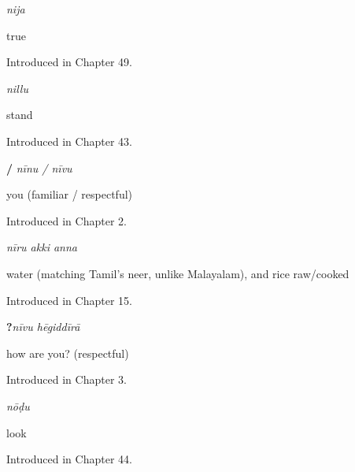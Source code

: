 \noindent\begin{minipage}[t]{\linewidth}
\raggedright
\textbf{}\enspace\emph{nija}\par
\small true\par
\footnotesize Introduced in Chapter 49.
\end{minipage}\par\medskip

\noindent\begin{minipage}[t]{\linewidth}
\raggedright
\textbf{}\enspace\emph{nillu}\par
\small stand\par
\footnotesize Introduced in Chapter 43.
\end{minipage}\par\medskip

\noindent\begin{minipage}[t]{\linewidth}
\raggedright
\textbf{ / }\enspace\emph{nīnu / nīvu}\par
\small you (familiar / respectful)\par
\footnotesize Introduced in Chapter 2.
\end{minipage}\par\medskip

\noindent\begin{minipage}[t]{\linewidth}
\raggedright
\textbf{  }\enspace\emph{nīru akki anna}\par
\small water (matching Tamil's neer, unlike Malayalam), and rice raw/cooked\par
\footnotesize Introduced in Chapter 15.
\end{minipage}\par\medskip

\noindent\begin{minipage}[t]{\linewidth}
\raggedright
\textbf{ ?}\enspace\emph{nīvu hēgiddīrā}\par
\small how are you? (respectful)\par
\footnotesize Introduced in Chapter 3.
\end{minipage}\par\medskip

\noindent\begin{minipage}[t]{\linewidth}
\raggedright
\textbf{}\enspace\emph{nōḍu}\par
\small look\par
\footnotesize Introduced in Chapter 44.
\end{minipage}\par\medskip

